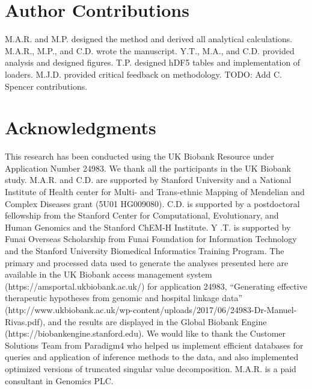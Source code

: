 \section*{Author Contributions}
M.A.R. and M.P. designed the method and derived all analytical calculations. M.A.R., M.P., and C.D. wrote the manuscript. Y.T., M.A., and C.D. provided analysis and designed figures. T.P. designed hDF5 tables and implementation of loaders. M.J.D. provided critical feedback on methodology. TODO: Add C. Spencer contributions.

\section*{Acknowledgments}
This research has been conducted using the UK Biobank Resource under Application Number 24983. We thank all the participants in the UK Biobank study. M.A.R. and C.D. are supported by Stanford University and a National Institute of Health center for Multi- and Trans-ethnic Mapping of Mendelian and Complex Diseases grant (5U01 HG009080). C.D. is supported by a postdoctoral fellowship from the Stanford Center for Computational, Evolutionary, and Human Genomics and the Stanford ChEM-H Institute. Y .T. is supported by Funai Overseas Scholarship from Funai Foundation for Information Technology and the Stanford University Biomedical Informatics Training Program. The primary and processed data used to generate the analyses presented here are available in the UK Biobank access management system (https://amsportal.ukbiobank.ac.uk/) for application 24983, ``Generating effective therapeutic hypotheses from genomic and hospital linkage data'' (http://www.ukbiobank.ac.uk/wp-content/uploads/2017/06/24983-Dr-Manuel-Rivas.pdf), and the results are displayed in the Global Biobank Engine (https://biobankengine.stanford.edu). We would like to thank the Customer Solutions Team from Paradigm4 who helped us implement efficient databases for queries and application of inference methods to the data, and also implemented optimized versions of truncated singular value decomposition. M.A.R. is a paid consultant in Genomics PLC.

\nolinenumbers

% 

